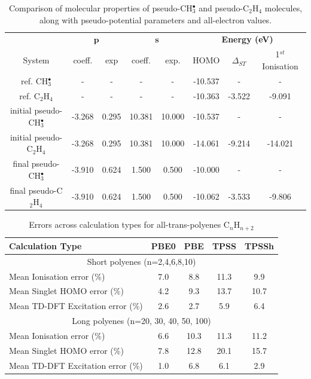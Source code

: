 \documentclass[12pt]{article}
\begin{document}
\begin{table}[h]
\caption{\label{table:potential_params} Comparison of molecular properties of pseudo-CH$^{\bullet}_{3}$ and pseudo-C$_{2}$H$_{4}$ molecules, along with pseudo-potential parameters and all-electron values.}
\begin{tabular}{| c | c | c | c | c | c | c | c| }
\hline
 & \multicolumn{2}{c}{\textbf{$\bm{p}$}} & \multicolumn{2}{c|}{$\bm{s}$} & \multicolumn{3}{c|}{\textbf{Energy (eV)}} \\
System & coeff. & exp & coeff. & exp. & HOMO & $\Delta_{ST}$ & 1$^{st}$ Ionisation \\
\hline
ref. CH$^{\bullet}_{3}$ & - & - & - & - & -10.537 & - & - \\
ref. C$_{2}$H$_{4}$ & - & - & - & - & -10.363 & -3.522 & -9.091 \\
\hline
initial pseudo-CH$^{\bullet}_{3}$ & -3.268 & 0.295 & 10.381 & 10.000 & -10.537 & - & - \\
initial pseudo-C$_{2}$H$_{4}$ & -3.268 & 0.295 & 10.381 & 10.000 & -14.061 & -9.214 & -14.021\\
\hline
final pseudo-CH$^{\bullet}_{3}$ & -3.910 & 0.624 & 1.500 & 0.500 & -10.000 & - & - \\
final pseudo-C$_{2}$H$_{4}$ & -3.910 & 0.624 & 1.500 & 0.500 & -10.062 & -3.533 & -9.806 \\
\hline
\end{tabular}
\end{table}


\newpage

\begin{table}[h]
\caption{Errors across calculation types for all-trans-polyenes C$_n$H$_{n+2}$}
\begin{tabular}{|l| c| c| c| c |}
\hline
\textbf{Calculation Type} & \textbf{PBE0} & \textbf{PBE} & \textbf{TPSS} & \textbf{TPSSh} \\
\hline
\multicolumn{5}{|c|}{Short polyenes (n=2,4,6,8,10)}\\
\hline
Mean Ionisation  error (\%) & 7.0 & 8.8 & 11.3 & 9.9 \\\hline
Mean Singlet HOMO  error (\%) & 4.2 & 9.3 & 13.7 & 10.7 \\\hline
Mean TD-DFT Excitation error (\%) & 2.6 & 2.7 & 5.9 & 6.4 \\ 
\hline
\multicolumn{5}{|c|}{Long polyenes (n=20, 30, 40, 50, 100)}\\
\hline
Mean Ionisation  error (\%) & 6.6 & 10.3 & 11.3 & 11.2 \\\hline
Mean Singlet HOMO  error (\%) & 7.8 & 12.8 & 20.1 & 15.7 \\\hline
Mean TD-DFT Excitation error (\%) & 1.0 & 6.8 & 6.1 & 2.9 \\
\hline
\end{tabular}
\label{table:alkene_errors}
\end{table}
\end{document}
